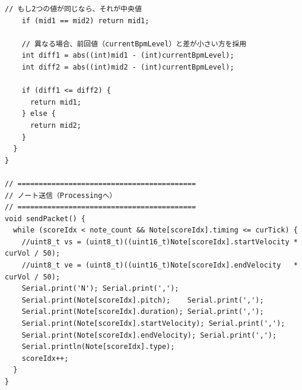 \begin{lstlisting}[caption={drum\_0706.ino（楽譜データは冒頭2小節のみ掲載）}, label={lst:douki_drum_full}]
    // もし2つの値が同じなら、それが中央値
    if (mid1 == mid2) return mid1;

    // 異なる場合、前回値（currentBpmLevel）と差が小さい方を採用
    int diff1 = abs((int)mid1 - (int)currentBpmLevel);
    int diff2 = abs((int)mid2 - (int)currentBpmLevel);

    if (diff1 <= diff2) {
      return mid1;
    } else {
      return mid2;
    }
  }
}

// ==========================================
// ノート送信（Processingへ）
// ==========================================
void sendPacket() {
  while (scoreIdx < note_count && Note[scoreIdx].timing <= curTick) {
    //uint8_t vs = (uint8_t)((uint16_t)Note[scoreIdx].startVelocity * curVol / 50);
    //uint8_t ve = (uint8_t)((uint16_t)Note[scoreIdx].endVelocity   * curVol / 50);
    Serial.print('N'); Serial.print(',');
    Serial.print(Note[scoreIdx].pitch);    Serial.print(',');
    Serial.print(Note[scoreIdx].duration); Serial.print(',');
    Serial.print(Note[scoreIdx].startVelocity); Serial.print(',');
    Serial.print(Note[scoreIdx].endVelocity); Serial.print(',');
    Serial.println(Note[scoreIdx].type);
    scoreIdx++;
  }
}
\end{lstlisting}

